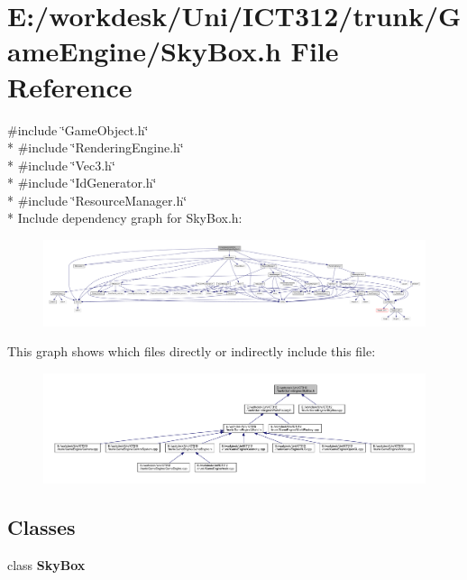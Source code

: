 \section{E\+:/workdesk/\+Uni/\+I\+C\+T312/trunk/\+Game\+Engine/\+Sky\+Box.h File Reference}
\label{_sky_box_8h}
{\ttfamily \#include \char`\"{}Game\+Object.\+h\char`\"{}}\\*
{\ttfamily \#include \char`\"{}Rendering\+Engine.\+h\char`\"{}}\\*
{\ttfamily \#include \char`\"{}Vec3.\+h\char`\"{}}\\*
{\ttfamily \#include \char`\"{}Id\+Generator.\+h\char`\"{}}\\*
{\ttfamily \#include \char`\"{}Resource\+Manager.\+h\char`\"{}}\\*
Include dependency graph for Sky\+Box.\+h\+:\nopagebreak
\begin{figure}[H]
\begin{center}
\leavevmode
\includegraphics[width=350pt]{d3/def/_sky_box_8h__incl}
\end{center}
\end{figure}
This graph shows which files directly or indirectly include this file\+:\nopagebreak
\begin{figure}[H]
\begin{center}
\leavevmode
\includegraphics[width=350pt]{de/db7/_sky_box_8h__dep__incl}
\end{center}
\end{figure}
\subsection*{Classes}
\begin{DoxyCompactItemize}
\item 
class {\bf Sky\+Box}
\end{DoxyCompactItemize}
